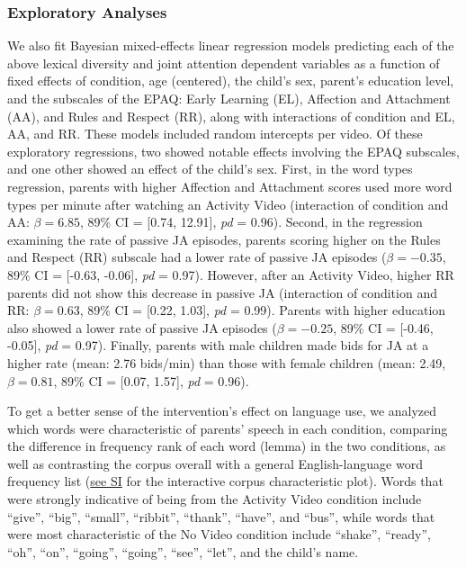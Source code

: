 \documentclass[
  english,
  man]{apa6}
\begin{document}
\hypertarget{exploratory-analyses}{%
\subsubsection{Exploratory Analyses}\label{exploratory-analyses}}

We also fit Bayesian mixed-effects linear regression models predicting each of the above lexical diversity and joint attention dependent variables as a function of fixed effects of condition, age (centered), the child's sex, parent's education level, and the subscales of the EPAQ: Early Learning (EL), Affection and Attachment (AA), and Rules and Respect (RR), along with interactions of condition and EL, AA, and RR.
These models included random intercepts per video.
Of these exploratory regressions, two showed notable effects involving the EPAQ subscales, and one other showed an effect of the child's sex.
First, in the word types regression, parents with higher Affection and Attachment scores used more word types per minute after watching an Activity Video (interaction of condition and AA: \(\beta=6.85\), 89\% CI = {[}0.74, 12.91{]}, \emph{pd} = 0.96).
Second, in the regression examining the rate of passive JA episodes, parents scoring higher on the Rules and Respect (RR) subscale had a lower rate of passive JA episodes (\(\beta=-0.35\), 89\% CI = {[}-0.63, -0.06{]}, \emph{pd} = 0.97).
However, after an Activity Video, higher RR parents did not show this decrease in passive JA (interaction of condition and RR: \(\beta=0.63\), 89\% CI = {[}0.22, 1.03{]}, \emph{pd} = 0.99).
Parents with higher education also showed a lower rate of passive JA episodes (\(\beta=-0.25\), 89\% CI = {[}-0.46, -0.05{]}, \emph{pd} = 0.97).
Finally, parents with male children made bids for JA at a higher rate (mean: 2.76 bids/min) than those with female children (mean: 2.49, \(\beta=0.81\), 89\% CI = {[}0.07, 1.57{]}, \emph{pd} = 0.96).

To get a better sense of the intervention's effect on language use, we analyzed which words were characteristic of parents' speech in each condition, comparing the difference in frequency rank of each word (lemma) in the two conditions, as well as contrasting the corpus overall with a general English-language word frequency list (\href{https://cogsciguy.github.io/parenting_obs_language/Exp1_characteristic_chart.html}{see SI}
for the interactive corpus characteristic plot).
Words that were strongly indicative of being from the Activity Video condition include \enquote{give}, \enquote{big}, \enquote{small}, \enquote{ribbit}, \enquote{thank}, \enquote{have}, and \enquote{bus}, while words that were most characteristic of the No Video condition include \enquote{shake}, \enquote{ready}, \enquote{oh}, \enquote{on}, \enquote{going}, \enquote{going}, \enquote{see}, \enquote{let}, and the child's name.
\end{document}
